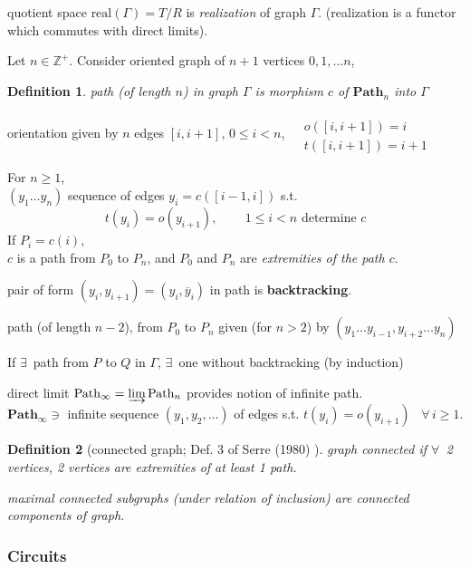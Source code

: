 \documentclass[10pt]{amsart}
\newtheorem{definition}{Definition}
\begin{document}
\begin{multicols*}{2}
quotient space $\text{real}(\Gamma) = T/R $ is \emph{realization} of graph $\Gamma$.  (realization is a functor which commutes with direct limits).  

Let $n\in \mathbb{Z}^+$.  Consider oriented graph of $n+1$ vertices $0,1,\dots n$,  \\

\begin{definition}
	path (of length $n$) in graph $\Gamma$ is morphism $c$ of $\mathbf{\text{Path}}_n$ into $\Gamma$  
\end{definition}

orientation given by $n$ edges $[i,i+1]$, $0\leq i <n$, $\begin{aligned} & \quad \\
& o([i,i+1]) = i \\
& t([i,i+1]) = i+1 \end{aligned}$  

For $n\geq 1$, \\
$(y_1\dots y_n)$ sequence of edges $y_i = c([i-1,i])$ s.t. 
\[
t(y_i) = o(y_{i+1}), \qquad \, 1 \leq i < n \text{ determine } c
\]
If $P_i = c(i)$,  \\
$c$ is a path from $P_0$ to $P_n$, and $P_0$ and $P_n$ are \emph{extremities of the path $c$}.  

pair of form $(y_i,y_{i+1})=(y_i, \overline{y}_i)$ in path is \textbf{backtracking}.  

path (of length $n-2$), from $P_0$ to $P_n$ given (for $n>2$) by $(y_1\dots y_{i-1}, y_{i+2}\dots y_n)$  

If $\exists \, $ path from $P$ to $Q$ in $\Gamma$, $\exists \, $ one without backtracking (by induction)  

direct limit $\mathbf{\text{Path}}_{\infty} = \varinjlim \mathbf{\text{Path}}_n$ provides notion of infinite path.  \\
$\mathbf{\text{Path}}_{\infty} \ni $ infinite sequence $(y_1,y_2 , \dots)$ of edges s.t. $t(y_i) = o(y_{i+1})$ \, $\forall \, i \geq 1$.  


\begin{definition}[connected graph; Def. 3 of Serre (1980) \cite{Serr1980}]
	graph connected if $\forall \, $ 2 vertices, 2 vertices are extremities of at least 1 path.  
	
	maximal connected subgraphs (under relation of inclusion) are \emph{connected components} of graph.  
\end{definition}

\subsubsection{Circuits}  


\end{multicols*}
\end{document}
